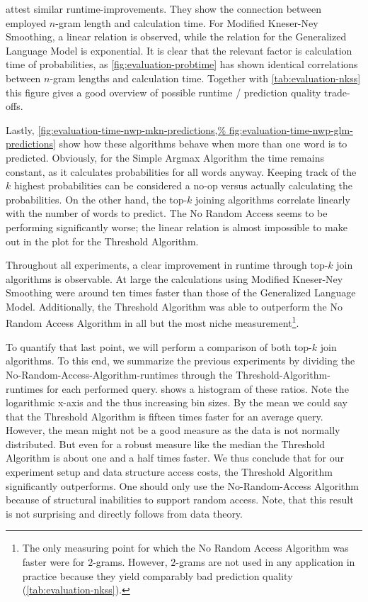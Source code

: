 attest similar runtime-improvements.
They show the connection between employed $n$-gram length and calculation time.
For Modified Kneser-Ney Smoothing, a linear relation is observed, while the
relation for the Generalized Language Model is exponential.
It is clear that the relevant factor is calculation time of probabilities, as
\cref{fig:evaluation-probtime} has shown identical correlations between $n$-gram
lengths and calculation time.
Together with \cref{tab:evaluation-nkss} this figure gives a good overview of
possible runtime / prediction quality trade-offs.

Lastly, \cref{fig:evaluation-time-nwp-mkn-predictions,%
fig:evaluation-time-nwp-glm-predictions} show how these algorithms behave
when more than one word is to predicted.
Obviously, for the Simple Argmax Algorithm the time remains constant, as it
calculates probabilities for all words anyway.
Keeping track of the $k$ highest probabilities can be considered a no-op versus
actually calculating the probabilities.
On the other hand, the top-$k$ joining algorithms correlate linearly with
the number of words to predict.
The No Random Access seems to be performing significantly worse; the linear
relation is almost impossible to make out in the plot for the Threshold
Algorithm.

Throughout all experiments, a clear improvement in runtime through top-$k$ join
algorithms is observable.
At large the calculations using Modified Kneser-Ney Smoothing were around ten
times faster than those of the Generalized Language Model.
Additionally, the Threshold Algorithm was able to outperform the No Random Access
Algorithm in all but the most niche measurement\footnote{The only measuring
point for which the No Random Access Algorithm was faster were for $2$-grams.
However, $2$-grams are not used in any application in practice because they yield
comparably bad prediction quality (\cref{tab:evaluation-nkss}).}.

To quantify that last point, we will perform a comparison of both top-$k$ join
algorithms.
To this end, we summarize the previous experiments by dividing the
No-Random-Access-Algorithm-runtimes through the Threshold-Algorithm-runtimes
for each performed query.
 shows a histogram of these ratios.
Note the logarithmic x-axis and the thus increasing bin sizes.
By the mean we could say that the Threshold Algorithm is fifteen times faster
for an average query.
However, the mean might not be a good measure as the data is not normally
distributed.
But even for a robust measure like the median the Threshold Algorithm is about
one and a half times faster.
We thus conclude that for our experiment setup and data structure access costs,
the Threshold Algorithm significantly outperforms.
One should only use the No-Random-Access Algorithm because of structural
inabilities to support random access.
Note, that this result is not surprising and directly follows from data theory.

